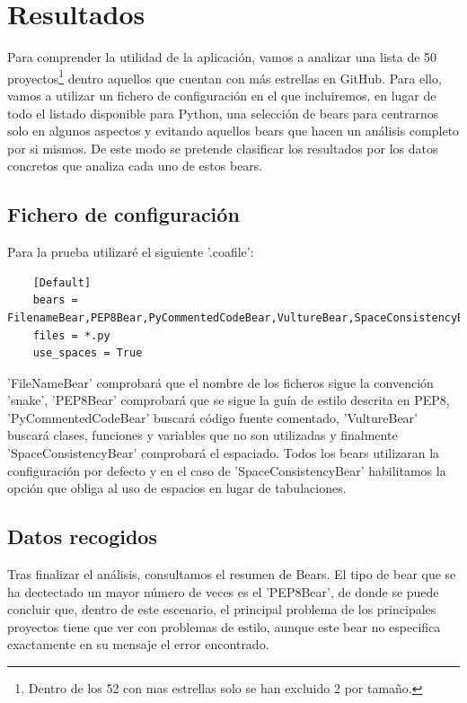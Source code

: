 \documentclass[a4paper, 12pt]{book}
\begin{document}

\cleardoublepage
\chapter{Resultados}
Para comprender la utilidad de la aplicación, vamos a analizar una lista de 50 proyectos\footnote{Dentro de los 52 con mas estrellas solo se han excluido 2 por tamaño.} dentro aquellos que cuentan con más estrellas en GitHub. Para ello, vamos a utilizar un fichero de configuración en el que incluiremos, en lugar de todo el listado disponible para Python, una selección de bears para centrarnos solo en algunos aspectos y evitando aquellos bears que hacen un análisis completo por si mismos. De este modo se pretende clasificar los resultados por los datos concretos que analiza cada uno de estos bears.

\section{Fichero de configuración}
\label{sec:_coafile}
Para la prueba utilizaré el siguiente '.coafile':

{\footnotesize
\begin{verbatim}
    [Default]
    bears = FilenameBear,PEP8Bear,PyCommentedCodeBear,VultureBear,SpaceConsistencyBear
    files = *.py
    use_spaces = True
\end{verbatim}
}
'FileNameBear' comprobará que el nombre de los ficheros sigue la convención 'snake', 'PEP8Bear' comprobará que se sigue la guía de estilo descrita en PEP8, 'PyCommentedCodeBear' buscará código fuente comentado, 'VultureBear' buscará clases, funciones y variables que no son utilizadas y finalmente 'SpaceConsistencyBear' comprobará el espaciado. Todos los bears utilizaran la configuración por defecto y en el caso de 'SpaceConsistencyBear' habilitamos la opción que obliga al uso de espacios en lugar de tabulaciones.

\section{Datos recogidos}
\label{sec:_datarec}
Tras finalizar el análisis, consultamos el resumen de Bears. El tipo de bear que se ha dectectado un mayor número de veces es el 'PEP8Bear', de donde se puede concluir que, dentro de este escenario, el principal problema de los principales proyectos tiene que ver con problemas de estilo, aunque este bear no especifica exactamente en su mensaje el error encontrado.
\end{document}

